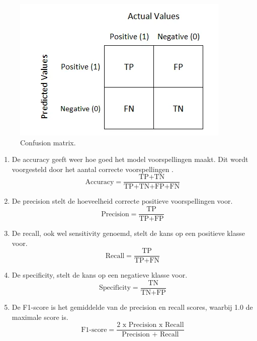 \begin{figure}
    \centering
    \includegraphics{graphics/confusionmatrix.PNG}
    \caption[Confusion matrix]{\label{fig:confusionmatrix}Confusion matrix\autocite{Narkhede2018}.}
\end{figure}
\begin{enumerate}
    \item De accuracy geeft weer hoe goed het model voorspellingen maakt. Dit wordt voorgesteld door het aantal correcte voorspellingen  \autocite{Narkhede2018}.
    \[ \text{Accuracy} = \frac{\text{TP+TN}}{\text{TP+TN+FP+FN}} \]
    
    \item De precision stelt de hoeveelheid correcte positieve voorspellingen voor.
    \[ \text{Precision} = \frac{\text{TP}}{\text{TP+FP}} \]
    
    \item De recall, ook wel sensitivity genoemd, stelt de kans op een positieve klasse voor.  
    \[ \text{Recall} = \frac{\text{TP}}{\text{TP+FN}} \]
    
    \item De specificity, stelt de kans op een negatieve klasse voor.
    \[ \text{Specificity} = \frac{\text{TN}}{\text{TN+FP}} \]
    
    \item De F1-score is het gemiddelde van de precision en recall scores, waarbij 1.0 de maximale score is.
    \[ \text{F1-score} = \frac{\text{2 x Precision x Recall}}{\text{Precision + Recall}} \]

\end{enumerate}